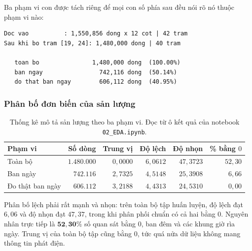 \documentclass[12pt, a4paper]{report}
\begin{document}
Ba phạm vi con được tách riêng để mọi con số phía sau đều nói rõ nó thuộc phạm vi nào:

\begingroup
\par{}\vspace{8pt}
\small\renewcommand{\baselinestretch}{1.0}\selectfont
\begin{verbatim}
Doc vao          : 1,550,856 dong x 12 cot | 42 tram
Sau khi bo tram [19, 24]: 1,480,000 dong | 40 tram

   toan bo               1,480,000 dong  (100.00%)
   ban ngay                742,116 dong  (50.14%)
   do that ban ngay        606,112 dong  (40.95%)
\end{verbatim}
\par\vspace{8pt}
\endgroup
\subsubsection{Phân bố đơn biến của sản lượng}

\begin{table}[htbp]
\centering
\caption{Thống kê mô tả sản lượng theo ba phạm vi. Đọc từ ô kết quả của notebook
\texttt{02\_EDA.ipynb}.}
\label{tab:eda_mo_ta}
\small
\begin{tabular}{l r r r r r}
\toprule
\textbf{Phạm vi} & \textbf{Số dòng} & \textbf{Trung vị} & \textbf{Độ lệch} & \textbf{Độ nhọn} & \textbf{\% bằng $0$} \\
\midrule
Toàn bộ          & $1.480.000$ & $0{,}0000$ & $6{,}0612$ & $47{,}3723$ & $52{,}30$ \\
Ban ngày         & $742.116$   & $2{,}7325$ & $4{,}5148$ & $25{,}3908$ & $6{,}66$ \\
Đo thật ban ngày & $606.112$   & $3{,}2188$ & $4{,}4313$ & $24{,}5310$ & $0{,}00$ \\
\bottomrule
\end{tabular}
\end{table}

Phân bố lệch phải rất mạnh và nhọn: trên toàn bộ tập huấn luyện, độ lệch đạt $6{,}06$ và độ
nhọn đạt $47{,}37$, trong khi phân phối chuẩn có cả hai bằng $0$. Nguyên nhân trực tiếp là
$\mathbf{52{,}30\%}$ số quan sát bằng $0$, ban đêm và các khung giờ rìa ngày. Trung vị của
toàn bộ tập cũng bằng $0$, tức quá nửa dữ liệu không mang thông tin phát điện.
\end{document}
